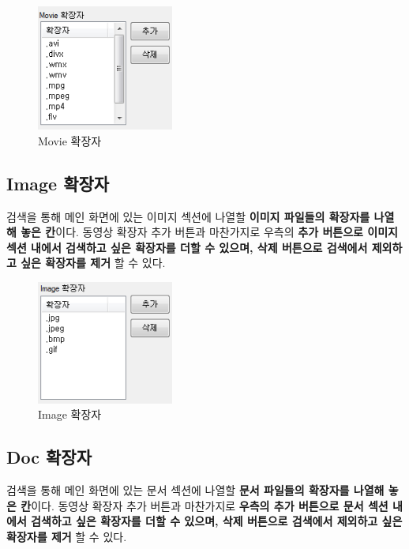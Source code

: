 \documentclass[a4paper, 13pt]{article} %
\begin{document}
		\begin{figure}[h]
			\centering
			\includegraphics[width=0.4\textwidth]{Figures/Movie}
			\caption{Movie 확장자}
			\label{fig:movie}
		\end{figure}
	
		\subsection{Image 확장자}
		검색을 통해 메인 화면에 있는 이미지 섹션에 나열할 \textbf{이미지 파일들의 확장자를 나열해 놓은 칸}이다. 동영상 확장자 추가 버튼과 마찬가지로 우측의 \textbf{추가 버튼으로 이미지 섹션 내에서 검색하고 싶은 확장자를 더할 수 있으며, 삭제 버튼으로 검색에서 제외하고 싶은 확장자를 제거} 할 수 있다.
		
		\begin{figure}[h]
			\centering
			\includegraphics[width=0.4\textwidth]{Figures/Image}
			\caption{Image 확장자}
			\label{fig:image}
		\end{figure}
	
		\newpage
		
		\subsection{Doc 확장자}		
		검색을 통해 메인 화면에 있는 문서 섹션에 나열할 \textbf{문서 파일들의 확장자를 나열해 놓은 칸}이다. 동영상 확장자 추가 버튼과 마찬가지로 \textbf{우측의 추가 버튼으로 문서 섹션 내에서 검색하고 싶은 확장자를 더할 수 있으며, 삭제 버튼으로 검색에서 제외하고 싶은 확장자를 제거} 할 수 있다.
		
\end{document}
